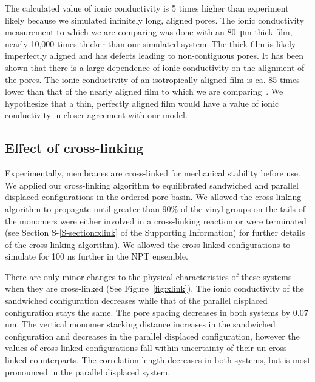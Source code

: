 \documentclass[journal=jpcbfk,manuscript=article]{achemso}
\begin{document}
  The calculated value of ionic conductivity is 5 times higher than experiment likely because 
  we simulated infinitely long, aligned pores. The ionic conductivity measurement 
  to which we are comparing was done with an \SI{80}{\micro\metre}-thick film, 
  nearly 10,000 times thicker than our simulated
  system. The thick film is likely imperfectly aligned and has defects leading to
  non-contiguous pores. It has been shown that there is a large dependence of 
  ionic conductivity on the alignment of the pores. The ionic conductivity of an
  isotropically aligned film is ca. 85 times lower than that of the nearly aligned
  film to which we are comparing~\cite{feng_scalable_2014}. We hypothesize that a 
  thin, perfectly aligned film would have a value of ionic conductivity in closer
  agreement with our model.

  \subsection{Effect of cross-linking}\label{section:xlink}

  Experimentally, membranes are cross-linked for mechanical stability before use. We applied 
  our cross-linking algorithm to equilibrated sandwiched and parallel
  displaced configurations in the ordered pore basin. We allowed the cross-linking
  algorithm to propagate until greater than 90\% of the vinyl groups on the tails of the 
  monomers were either involved in a cross-linking reaction or were terminated 
  (see Section S-\ref{S-section:xlink} of the Supporting Information)
  for further details of the cross-linking algorithm). We allowed the cross-linked
  configurations to simulate for 100 ns further in the NPT ensemble. 

  There are only minor changes to the physical characteristics of these systems when 
  they are cross-linked (See Figure~\ref{fig:xlink}). The ionic conductivity of 
  the sandwiched configuration decreases while that of the parallel displaced 
  configuration stays the same. The pore spacing decreases in both systems by
  0.07 nm. The vertical monomer stacking distance increases in the sandwiched
  configuration and decreases in the parallel displaced configuration, however the 
  values of cross-linked configurations fall within uncertainty of their un-cross-linked
  counterparts. The correlation length decreases in both systems, 
  but is most pronounced in the parallel displaced system.  
  
\end{document}
